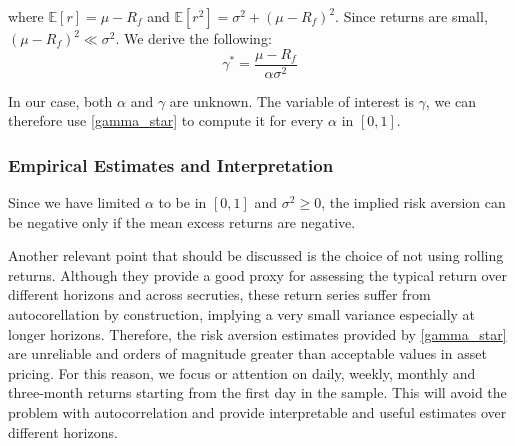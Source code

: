 where $\mathbb{E}[r]=\mu-R_f$ and $\mathbb{E}[r^2]=\sigma^2+(\mu-R_f)^2$. 
Since returns are small, $(\mu-R_f)^2\ll\sigma^2$. We derive the following:
\begin{equation}
    \gamma^* = \frac{\mu-R_f}{\alpha \sigma^2}
    \label{gamma_star}
\end{equation}

In our case, both $\alpha$ and $\gamma$ are unknown. 
The variable of interest is $\gamma$, we can therefore use \ref{gamma_star} to compute it for every $\alpha$ in $[0,1]$. 


\subsubsection{Empirical Estimates and Interpretation}
\label{sec:gamma_estimates}
Since we have limited $\alpha$ to be in $[0,1]$ and $\sigma^2 \geq 0$, the implied risk aversion can be negative only if the mean excess returns are negative.

Another relevant point that should be discussed is the choice of not using rolling returns. 
Although they provide a good proxy for assessing the typical return over different horizons and across secruties, 
these return series suffer from autocorellation by construction, implying a very small variance especially at longer horizons.
Therefore, the risk aversion estimates provided by \ref{gamma_star} are unreliable and orders of magnitude greater than acceptable values in asset pricing.
For this reason, we focus or attention on daily, weekly, monthly and three-month returns starting from the first day in the sample. This will avoid the problem with autocorrelation and provide interpretable and useful estimates over different horizons.




